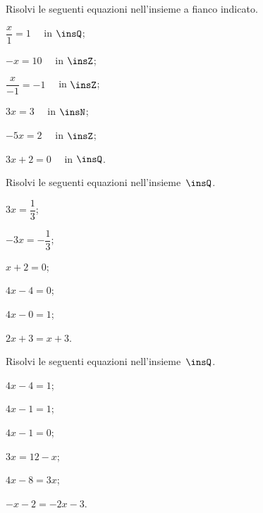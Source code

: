 \begin{esercizio}
\label{ese:15.24}
Risolvi le seguenti equazioni nell'insieme a fianco indicato.
\begin{multicols}{3}
\begin{enumeratea}
\spazielenx
 \item $\dfrac{x}{1}=1\quad$ in $\insQ$;
 \item $-x=10\quad$ in $\insZ$;
 \item $\dfrac{x}{-1}=-1\quad$ in $\insZ$;
 \item $3x=3\quad$ in $\insN$;
 \item $-5x=2\quad$ in $\insZ$;
 \item $3x+2=0\quad$ in $\insQ$.
\end{enumeratea}
\end{multicols}
\end{esercizio}

\begin{esercizio}
\label{ese:15.25}
Risolvi le seguenti equazioni nell'insieme~$\insQ$.
\begin{multicols}{3}
\begin{enumeratea}
\spazielenx
 \item $3x=\dfrac{1}{3}$;
 \item $-3x=-{\dfrac{1}{3}}$;
 \item $x+2=0$;
 \item $4x-4=0$;
 \item $4x-0=1$;
 \item $2x+3=x+3$.
\end{enumeratea}
\end{multicols}
\end{esercizio}

\begin{esercizio}
\label{ese:15.26}
Risolvi le seguenti equazioni nell'insieme~$\insQ$.
\begin{multicols}{3}
\begin{enumeratea}
\spazielenx
 \item $4x-4=1$;
 \item $4x-1=1$;
 \item $4x-1=0$;
 \item $3x=12-x$;
 \item $4x-8=3x$;
 \item $-x-2=-2x-3$.
\end{enumeratea}
\end{multicols}
\end{esercizio}

